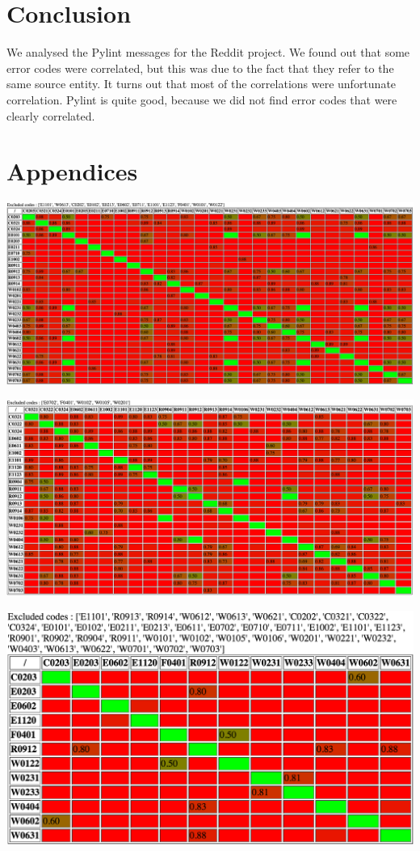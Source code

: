\documentclass[12pt, a4paper]{article}
\newcommand{\pyl}{\textsf{Pylint}}
\begin{document}
\section{Conclusion}

We analysed the \pyl{} messages for the Reddit project.
We found out that some error codes were correlated, but this was due to the fact that they refer to the same source entity.
It turns out that most of the correlations were unfortunate correlation.
\pyl{} is quite good, because we did not find error codes that were clearly correlated.



\newpage
\section*{Appendices}

\renewcommand{\textfraction}{0.01}
\renewcommand{\topfraction}{0.01}
\renewcommand{\bottomfraction}{0.01}
\renewcommand{\floatpagefraction}{0.01}
\setcounter{totalnumber}{1}

\includegraphics[angle=90,origin=c,totalheight=0.99\textheight]{cap1}

\includegraphics[angle=90,origin=c,totalheight=\textheight]{cap2}

\includegraphics[angle=90,origin=c,totalheight=\textheight]{cap3}
\end{document}
